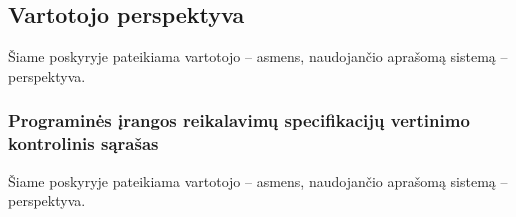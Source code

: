 \documentclass{VUMIFPSkursinis}
\begin{document}

\subsection{Vartotojo perspektyva}

Šiame poskyryje pateikiama vartotojo -- asmens, naudojančio aprašomą sistemą -- perspektyva.

\subsubsection{Programinės įrangos reikalavimų specifikacijų vertinimo kontrolinis sąrašas}

	Šiame poskyryje pateikiama vartotojo -- asmens, naudojančio aprašomą sistemą -- perspektyva.
\end{document}
